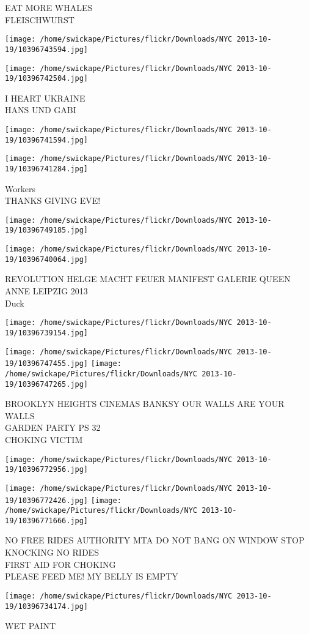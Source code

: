 \documentclass[10pt,letterpaper]{article}
\begin{document}
EAT MORE WHALES\\
FLEISCHWURST
\pagebreak

\texttt{[image: /home/swickape/Pictures/flickr/Downloads/NYC 2013-10-19/10396743594.jpg]}

\vspace{0.25in}
\texttt{[image: /home/swickape/Pictures/flickr/Downloads/NYC 2013-10-19/10396742504.jpg]}

I HEART UKRAINE\\
HANS UND GABI
\pagebreak

\texttt{[image: /home/swickape/Pictures/flickr/Downloads/NYC 2013-10-19/10396741594.jpg]}

\vspace{0.25in}
\texttt{[image: /home/swickape/Pictures/flickr/Downloads/NYC 2013-10-19/10396741284.jpg]}

Workers\\
THANKS GIVING EVE!
\pagebreak

\texttt{[image: /home/swickape/Pictures/flickr/Downloads/NYC 2013-10-19/10396749185.jpg]}

\vspace{0.25in}
\texttt{[image: /home/swickape/Pictures/flickr/Downloads/NYC 2013-10-19/10396740064.jpg]}

REVOLUTION HELGE MACHT FEUER MANIFEST GALERIE QUEEN ANNE LEIPZIG 2013\\
Duck
\pagebreak

\texttt{[image: /home/swickape/Pictures/flickr/Downloads/NYC 2013-10-19/10396739154.jpg]}

\vspace{0.25in}
\texttt{[image: /home/swickape/Pictures/flickr/Downloads/NYC 2013-10-19/10396747455.jpg]}
\texttt{[image: /home/swickape/Pictures/flickr/Downloads/NYC 2013-10-19/10396747265.jpg]}

BROOKLYN HEIGHTS CINEMAS BANKSY OUR WALLS ARE YOUR WALLS\\
GARDEN PARTY PS 32\\
CHOKING VICTIM
\pagebreak

\texttt{[image: /home/swickape/Pictures/flickr/Downloads/NYC 2013-10-19/10396772956.jpg]}

\vspace{0.25in}
\texttt{[image: /home/swickape/Pictures/flickr/Downloads/NYC 2013-10-19/10396772426.jpg]}
\texttt{[image: /home/swickape/Pictures/flickr/Downloads/NYC 2013-10-19/10396771666.jpg]}

NO FREE RIDES AUTHORITY MTA DO NOT BANG ON WINDOW STOP KNOCKING NO RIDES\\
FIRST AID FOR CHOKING\\
PLEASE FEED ME! MY BELLY IS EMPTY
\pagebreak

\texttt{[image: /home/swickape/Pictures/flickr/Downloads/NYC 2013-10-19/10396734174.jpg]}

WET PAINT
\pagebreak
\end{document}
